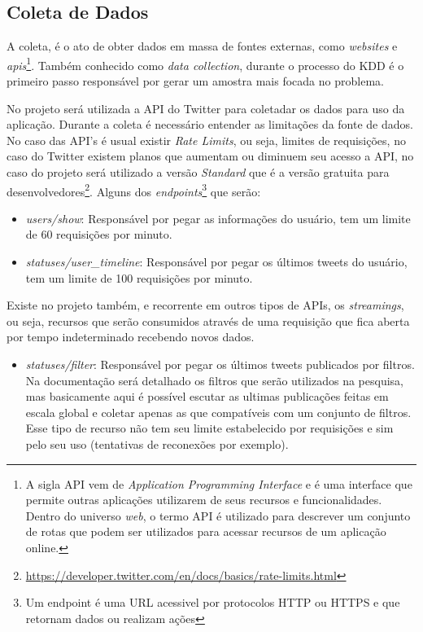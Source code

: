 \subsection{Coleta de Dados}
A coleta, é o ato de obter dados em massa de fontes externas, como \textit{websites} e \textit{apis}\footnote{A sigla API vem de \textit{Application Programming Interface} e é uma interface que permite outras aplicações utilizarem de seus recursos e funcionalidades. Dentro do universo \textit{web}, o termo API é utilizado para descrever um conjunto de rotas que podem ser utilizados para acessar recursos de um aplicação online.}. Também conhecido como \textit{data collection}, durante o processo do KDD é o primeiro passo responsável por gerar um amostra mais focada no problema.

No projeto será utilizada a API do Twitter para coletadar os dados para uso da aplicação. Durante a coleta é necessário entender as limitações da fonte de dados. No caso das API's é usual existir \textit{Rate Limits}, ou seja, limites de requisições, no caso do Twitter existem planos que aumentam ou diminuem seu acesso a API, no caso do projeto será utilizado a versão \textit{Standard} que é a versão gratuita para desenvolvedores\footnote{\url{https://developer.twitter.com/en/docs/basics/rate-limits.html}}. Alguns dos \textit{endpoints}\footnote{Um endpoint é uma URL acessivel por protocolos HTTP ou HTTPS e que retornam dados ou realizam ações} que serão:
\begin{itemize}
    \item \textit{users/show}: Responsável por pegar as informações do usuário, tem um limite de 60 requisições por minuto.
    \item \textit{statuses/user\_timeline}: Responsável por pegar os últimos tweets do usuário, tem um limite de 100 requisições por minuto.
\end{itemize}

Existe no projeto também, e recorrente em outros tipos de APIs, os \textit{streamings}, ou seja, recursos que serão consumidos através de uma requisição que fica aberta por tempo indeterminado recebendo novos dados.
\begin{itemize}
    \item \textit{statuses/filter}: Responsável por pegar os últimos tweets publicados por filtros. Na documentação será detalhado os filtros que serão utilizados na pesquisa, mas basicamente aqui é possível escutar as ultimas publicações feitas em escala global e coletar apenas as que compatíveis com um conjunto de filtros. Esse tipo de recurso não tem seu limite estabelecido por requisições e sim pelo seu uso (tentativas de reconexões por exemplo).
\end{itemize}

